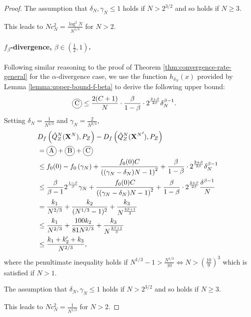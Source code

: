 \begin{proof}
The assumption that $\delta_N, \gamma_N \leq 1$ holds if $N>2^{3/2}$ and so holds if $N\geq3$.

This leads to $Nc_N^2 = \frac{\log^2N}{N^{1/3}}$ for $N>2$.


\paragraph{$f_\beta$-divergence, $\beta\in(\frac{1}{2},1)$.}

Following similar reasoning to the proof of Theorem \ref{thm:convergence-rate-general} for the $\alpha$-divergence case, we use the function $h_{\delta_N}(x)$ provided by Lemma \ref{lemma:upper-bound-f-beta} to derive the following upper bound:
%
\begin{align*}
    \encircle{C} &\leq \frac{2(C+1)}{N} \cdot \frac{\beta}{1-\beta}\cdot 2^{\frac{2+\beta}{2\beta}}\delta_N^{\beta-1}.
\end{align*}
%
Setting $\delta_N = \frac{1}{N^{2/3}}$ and $\gamma_N =\frac{2}{N^{2/3}}$,
%
\begin{align*}
    &D_f\left( \hat{Q}_Z^N(\XN) , P_Z\right) - D_f\left( \hat{Q}_Z^N({\XN}') , P_Z\right) \\
    &= \encircle{A} + \encircle{B} + \encircle{C} \\
    &\leq f_0(0) - f_0\left(\gamma_N\right) + \frac{f_0(0)C}{\left((\gamma_N-\delta_N)N - 1\right)^2} + \frac{\beta}{1-\beta}\cdot 2^{\frac{2+\beta}{2\beta}}\delta_N^{\beta-1} \\
    &\leq \frac{\beta}{\beta-1}2^{\frac{1-\beta}{\beta}}\gamma_N + \frac{f_0(0)C}{\left((\gamma_N-\delta_N)N - 1\right)^2}+ \frac{\beta}{1-\beta}\cdot 2^{\frac{2+\beta}{2\beta}} \frac{ \delta^{\beta-1}}{N} \\
    &= \frac{k_1}{N^{2/3}} + \frac{k_2}{(N^{1/3} - 1)^2} + \frac{k_3}{N^\frac{2\beta + 1}{3}}\\
    &\leq \frac{k_1}{N^{2/3}} + \frac{100k_2}{81N^{2/3}} + \frac{k_3}{N^\frac{2\beta + 1}{3}}\\
    &\leq \frac{k_1+k'_2 + k_3}{N^{2/3}},
\end{align*}
where the penultimate inequality holds if $N^{1/3}-1 > \frac{N^{1/3}}{10} \iff N>\left(\frac{10}{9}\right)^3$ which is satisfied if $N>1$.

The assumption that $\delta_N, \gamma_N \leq 1$ holds if $N>2^{3/2}$ and so holds if $N\geq3$.

This leads to $Nc_N^2 = \frac{1}{N^{1/3}}$ for $N>2$.
\end{proof}

